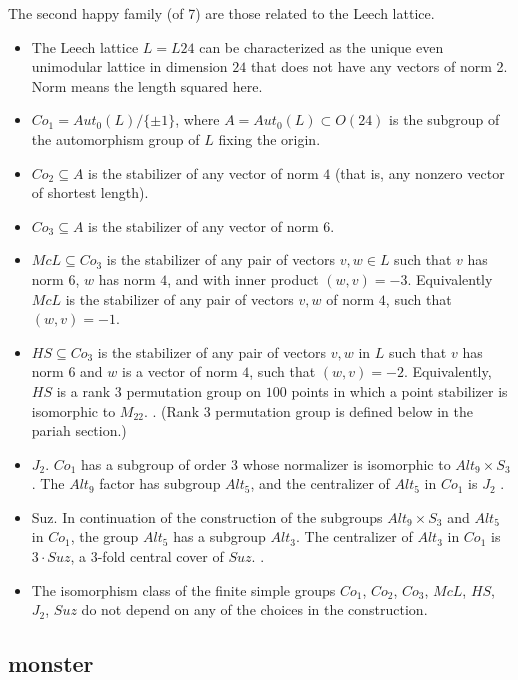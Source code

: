 The second happy family (of 7) are those related to the Leech lattice.
\begin{itemize}
\item The Leech lattice $L=L24$ can be characterized as the unique
  even unimodular lattice in dimension $24$ that does not have any
  vectors of norm 2.  Norm means the length squared here.
\item $Co_1 = Aut_0(L)/\{\pm 1\}$, where $A=Aut_0(L) \subset O(24)$ is
  the subgroup of the automorphism group of $L$ fixing the origin.
\item $Co_2 \subseteq A$ is the stabilizer of any vector of norm $4$
  (that is, any nonzero vector of shortest length).
\item $Co_3 \subseteq  A$ is the stabilizer of any vector of norm $6$.
\item $McL \subseteq Co_3$ is the stabilizer of any pair of vectors
  $v,w\in L$ such that $v$ has norm $6$, $w$ has norm $4$, and with
  inner product $(w,v) = -3$.  Equivalently $McL$ is the stabilizer of
  any pair of vectors $v,w$ of norm $4$, such that $(w,v) = -1$.
\item $HS \subseteq Co_3$ is the stabilizer of any pair of vectors
  $v,w$ in $L$ such that $v$ has norm $6$ and $w$ is a vector of norm
  $4$, such that $(w,v) = -2$.  Equivalently, $HS$ is a rank $3$
  permutation group on $100$ points in which a point stabilizer is
  isomorphic to $M_{22}$. \cite[p.116]{robert1998twelve}.  (Rank $3$
  permutation group is defined below in the pariah section.)
\item $J_2$.  $Co_1$ has a subgroup of order $3$ whose normalizer is
  isomorphic to $Alt_9 \times S_3$.  The $Alt_9$ factor has subgroup
  $Alt_5$, and the centralizer of $Alt_5$ in $Co_1$ is $J_2$
  \cite[p.218]{wilson2009finite}.
\item Suz.  In continuation of the construction of the subgroups
  $Alt_9 \times S_3$ and $Alt_5$ in $Co_1$, the group $Alt_5$ has a
  subgroup $Alt_3$.  The centralizer of $Alt_3$ in $Co_1$ is $3\cdot
  Suz$, a $3$-fold central cover of $Suz$.
  \cite[p.218]{wilson2009finite}.
\item The isomorphism class of the finite simple groups $Co_1$,
  $Co_2$, $Co_3$, $McL$, $HS$, $J_2$, $Suz$ do not depend on any of
  the choices in the construction.
\end{itemize}

\subsection{monster}


